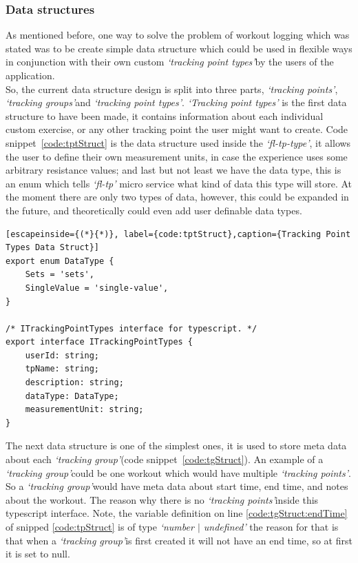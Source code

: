 \documentclass{article}
\newcommand{\vspaceconst}{-2ex}
\newcommand{\tpts}{\textit{`tracking point types'}}
\newcommand{\tps}{\textit{`tracking points'}}
\newcommand{\tg}{\textit{`tracking group'}}
\newcommand{\tgs}{\textit{`tracking groups'}}
\begin{document}
\begin{multicols}{2}
\subsubsection{Data structures}\label{sec:dataStruct}
\vspace{\vspaceconst}

As mentioned before, one way to solve the problem of workout logging which was stated was to be create simple data structure which could be used in flexible ways in conjunction with their own custom \tpts by the users of the application.\\
So, the current data structure design is split into three parts, \tps, \tgs and \tpts. \textit{`Tracking point types'} is the first data structure to have been made, it contains information about each individual custom exercise, or any other tracking point the user might want to create. Code snippet~\ref{code:tptStruct} is the data structure used inside the \textit{`fl-tp-type'}, it allows the user to define their own measurement units, in case the experience uses some arbitrary resistance values; and last but not least we have the data type, this is an enum which tells \textit{`fl-tp'} micro service what kind of data this type will store. At the moment there are only two types of data, however, this could be expanded in the future, and theoretically could even add user definable data types.\\

\begin{lstlisting}[escapeinside={(*}{*)}, label={code:tptStruct},caption={Tracking Point Types Data Struct}]
export enum DataType {
    Sets = 'sets',
    SingleValue = 'single-value',
}

/* ITrackingPointTypes interface for typescript. */
export interface ITrackingPointTypes {
    userId: string;
    tpName: string;
    description: string;
    dataType: DataType;
    measurementUnit: string;
}
\end{lstlisting}

The next data structure is one of the simplest ones, it is used to store meta data about each \tg (code snippet~\ref{code:tgStruct}). An example of a \tg could be one workout which would have multiple \tps. So a \tg would have meta data about start time, end time, and notes about the workout. The reason why there is no \tps inside this typescript interface. Note, the variable definition on line \ref{code:tgStruct:endTime} of snipped \ref{code:tpStruct} is of type \textit{`number $\vert$ undefined'} the reason for that is that when a \tg is first created it will not have an end time, so at first it is set to null.\\


\end{multicols}
\end{document}
